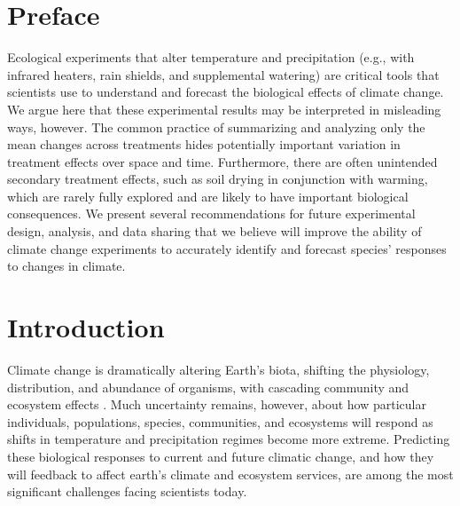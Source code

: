 \documentclass{article}
\begin{document}
\section* {Preface}
\par Ecological experiments that alter temperature and precipitation (e.g., with infrared heaters, rain shields, and supplemental watering) are critical tools that scientists use to understand and forecast the biological effects of climate change. We argue here that these experimental results may be interpreted in misleading ways, however. 
The common practice of summarizing and analyzing only the mean changes across treatments hides potentially important variation in treatment effects over space and time. Furthermore, there are often unintended secondary treatment effects, such as soil drying in conjunction with warming, which are rarely fully explored and are likely to have important biological consequences. %
We present several recommendations for future experimental design, analysis, and data sharing that we believe will improve the ability of climate change experiments to accurately identify and forecast species' responses to changes in climate.
\section* {Introduction}
\par Climate change is dramatically altering Earth's biota, shifting the physiology, distribution, and abundance of organisms, with cascading community and ecosystem effects \citep{shukla1982,cox2000,thomas2004,parmesan2006,field2007,sheldon2011,urban2012}. Much uncertainty remains, however, about how particular individuals, populations, species, communities, and ecosystems will respond as shifts in temperature and precipitation regimes become more extreme. Predicting these biological responses to current and future climatic change, and how they will feedback to affect earth's climate and ecosystem services, are among the most significant challenges facing scientists today.
\end{document}

